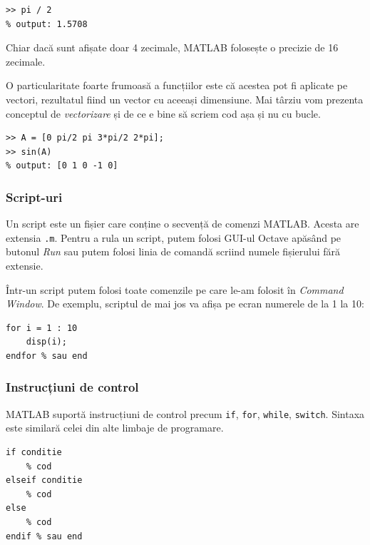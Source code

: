 \documentclass{exam}
\begin{document}
\begin{lstlisting}
>> pi / 2
% output: 1.5708
\end{lstlisting}

\par Chiar dacă sunt afișate doar 4 zecimale, MATLAB folosește o precizie de
16 zecimale.

\par O particularitate foarte frumoasă a funcțiilor este că acestea pot fi
aplicate pe vectori, rezultatul fiind un vector cu aceeași dimensiune. Mai
târziu vom prezenta conceptul de \textit{vectorizare} și de ce e bine să scriem
cod așa și nu cu bucle.

\begin{lstlisting}
>> A = [0 pi/2 pi 3*pi/2 2*pi];
>> sin(A)
% output: [0 1 0 -1 0]
\end{lstlisting}

\subsubsection{Script-uri}

\par Un script este un fișier care conține o secvență de comenzi MATLAB. Acesta
are extensia \verb|.m|. Pentru a rula un script, putem folosi GUI-ul Octave
apăsând pe butonul \textit{Run} sau putem folosi linia de comandă scriind numele
fișierului fără extensie.

\par Într-un script putem folosi toate comenzile pe care le-am folosit în
\textit{Command Window}. De exemplu, scriptul de mai jos va afișa pe ecran
numerele de la 1 la 10:

\begin{lstlisting}
for i = 1 : 10
	disp(i);
endfor % sau end
\end{lstlisting}

\subsubsection{Instrucțiuni de control}

\par MATLAB suportă instrucțiuni de control precum \verb|if|, \verb|for|,
\verb|while|, \verb|switch|. Sintaxa este similară celei din alte limbaje de programare.

\begin{lstlisting}
if conditie
	% cod
elseif conditie
	% cod
else
	% cod
endif % sau end
\end{lstlisting}
\end{document}
